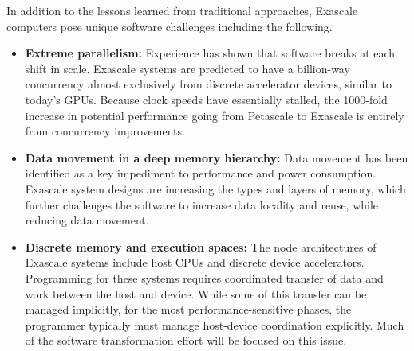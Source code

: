 In addition to the lessons learned from traditional approaches, Exascale computers pose unique software challenges including the following.
\begin{itemize}
\item \textbf{Extreme parallelism:} Experience has shown that software breaks at each shift in scale. Exascale systems are predicted to have a billion-way concurrency almost exclusively from discrete accelerator devices, similar to today's GPUs. Because clock speeds have essentially stalled, the 1000-fold increase in potential performance going from Petascale to Exascale is entirely from concurrency improvements.
\item \textbf{Data movement in a deep memory hierarchy: }Data movement has been identified as a key impediment to performance and power consumption. Exascale system designs are increasing the types and layers of memory, which further challenges the software to increase data locality and reuse, while reducing data movement.
\item \textbf{Discrete memory and execution spaces:} The node architectures of Exascale systems include host CPUs and discrete device accelerators.  Programming for these systems requires coordinated transfer of data and work between the host and device. While some of this transfer can be managed implicitly, for the most performance-sensitive phases, the programmer typically must manage host-device coordination explicitly.  Much of the software transformation effort will be focused on this issue.
\end{itemize}
 
